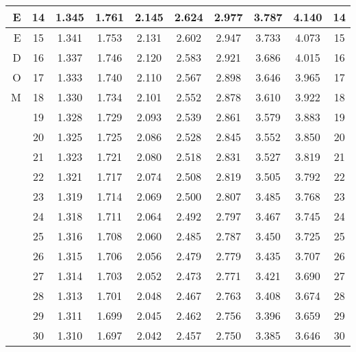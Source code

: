 \begin{table}[H]
\begin{center}
{{\begin{tabular}{|r|c|c|c|c|c|c|c|c|c|}
\hline E  &14 &   1.345 &  1.761 &  2.145 &  2.624 &  2.977 &  3.787 &  4.140 &  14  \\ 
\hline E  &15 &   1.341 &  1.753 &  2.131 &  2.602 &  2.947 &  3.733 &  4.073 &  15 \\ 
\hline D  &16 &   1.337 &  1.746 &  2.120 &  2.583 &  2.921 &  3.686 &  4.015 &  16 \\ 
\hline O  &17 &   1.333 &  1.740 &  2.110 &  2.567 &  2.898 &  3.646 &  3.965 &  17  \\ 
\hline M  &18 &   1.330 &  1.734 &  2.101 &  2.552 &  2.878 &  3.610 &  3.922 &  18  \\ 
\hline    &19 &   1.328 &  1.729 &  2.093 &  2.539 &  2.861 &  3.579 &  3.883 &  19  \\ 
\hline    &20 &   1.325 &  1.725 &  2.086 &  2.528 &  2.845 &  3.552 &  3.850 &  20  \\ 
\hline    &21 &   1.323 &  1.721 &  2.080 &  2.518 &  2.831 &  3.527 &  3.819 &  21  \\ 
\hline    &22 &   1.321 &  1.717 &  2.074 &  2.508 &  2.819 &  3.505 &  3.792 &  22  \\
\hline    &23 &   1.319 &  1.714 &  2.069 &  2.500 &  2.807 &  3.485 &  3.768 &  23  \\
\hline    &24 &   1.318 &  1.711 &  2.064 &  2.492 &  2.797 &  3.467 &  3.745 &  24  \\
\hline    &25 &   1.316 &  1.708 &  2.060 &  2.485 &  2.787 &  3.450 &  3.725 &  25  \\
\hline    &26 &   1.315 &  1.706 &  2.056 &  2.479 &  2.779 &  3.435 &  3.707 &  26  \\
\hline    &27 &   1.314 &  1.703 &  2.052 &  2.473 &  2.771 &  3.421 &  3.690 &  27  \\
\hline    &28 &   1.313 &  1.701 &  2.048 &  2.467 &  2.763 &  3.408 &  3.674 &  28  \\
\hline    &29 &   1.311 &  1.699 &  2.045 &  2.462 &  2.756 &  3.396 &  3.659 &  29  \\
\hline    &30 &   1.310 &  1.697 &  2.042 &  2.457 &  2.750 &  3.385 &  3.646 &  30  \\

\end{tabular}}}
\end{center}
\end{table}
